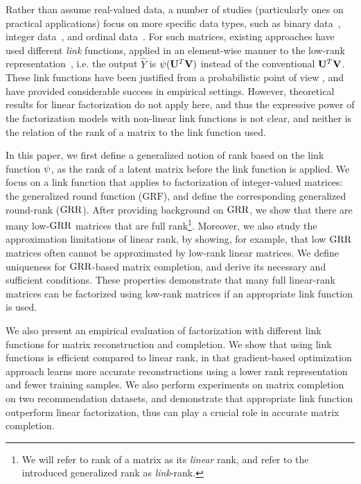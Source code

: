 \documentclass{article}
\newcommand{\sameer}[1]{\todo[color=blue!20]{\textbf{s:} #1}{}}
\begin{document}
Rather than assume real-valued data, a number of studies (particularly ones on practical applications) focus on more specific data types,
such as binary data~\citep{nickel13:logistic}, integer data~\citep{lin2009integer}, and ordinal data~\citep{koren2011ordrec,udell14:generalized}.
For such matrices, existing approaches have used different \emph{link} functions, applied in an element-wise manner to the low-rank representation~\citep{neumann16:what}, i.e. the output $\hat{Y}$ is $\psi(\mathbf{U}^T\mathbf{V})$ instead of the conventional $\mathbf{U}^T\mathbf{V}$.
These link functions have been justified from a probabilistic point of view \citep{collins01:a-generalization,salakhutdinov08:bayesian}, and have provided considerable success in  empirical settings.
However, theoretical results for linear factorization do not apply here, and thus the expressive power of the factorization models with non-linear link functions is not clear, and neither is the relation of the rank of a matrix to the link function used.

In this paper, we first define a generalized notion of rank based on the link function $\psi$, as the rank of a latent matrix before the link function is applied.
We focus on a link function that applies to factorization of integer-valued matrices: the generalized round function ($\text{GRF}$), and define the corresponding generalized round-rank ($\text{GRR}$). 
After providing background on $\text{GRR}$, we show that there are many low-$\text{GRR}$ matrices that are full rank\footnote{We will refer to rank of a matrix as its \emph{linear} rank, and refer to the introduced generalized rank as \emph{link}-rank.}.
Moreover, we also study the approximation limitations of linear rank, by showing, for example, that low $\text{GRR}$ matrices often cannot be approximated by low-rank linear matrices.
%
We define uniqueness for $\text{GRR}$-based matrix completion, and derive its necessary and sufficient conditions. These properties demonstrate that many full linear-rank matrices can be factorized using low-rank matrices if an appropriate link function is used.
%

We also present an empirical evaluation of factorization with different link functions for matrix reconstruction and completion.
We show that using link functions is efficient compared to linear rank, in that gradient-based optimization approach learns more accurate reconstructions using a lower rank representation and fewer training samples.
We also perform experiments on matrix completion on two recommendation datasets, and demonstrate that appropriate link function outperform linear factorization, thus can play a crucial role in accurate matrix completion.
\end{document}
